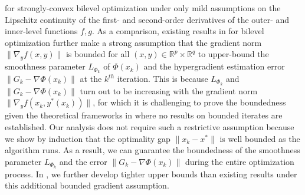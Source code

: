 \documentclass{osudissert96}
\begin{document}
for strongly-convex bilevel optimization under only mild assumptions on the Lipschitz continuity of the first- and second-order derivatives of the outer- and inner-level functions $f,g$. As a comparison, existing results in \cite{ghadimi2018approximation,ji2020bilevel} for bilevel optimization further make a strong assumption that the gradient norm $\|\nabla_y f(x,y)\|$ is bounded for all $(x,y)\in\mathbb{R}^p\times\mathbb{R}^q$ to upper-bound the smoothness parameter $L_{\Phi_k}$ of $\Phi(x_k)$ and the hypergradient estimation error $\|G_k-\nabla \Phi(x_k)\|$ at the $k^{th}$ iteration. This is because  $L_{\Phi_k}$ and $\|G_k-\nabla \Phi(x_k)\|$ turn out to be increasing with the gradient norm $\|\nabla_y f(x_k,y^*(x_k))\|$, for which it is challenging to prove the boundedness given the theoretical frameworks in \cite{ghadimi2018approximation,ji2020bilevel} where no results on bounded iterates are established.  Our analysis does not require such a restrictive assumption because we show by induction that the optimality gap $\|x_k-x^*\|$ is well bounded as the algorithm runs. As a result, we can guarantee the boundedness of the smoothness parameter $L_{\Phi_k}$ and the error $\|G_k-\nabla \Phi(x_k)\|$ during the entire optimization process.  
In , we further develop tighter upper bounds than existing results under this additional bounded gradient assumption. 

\end{document}
